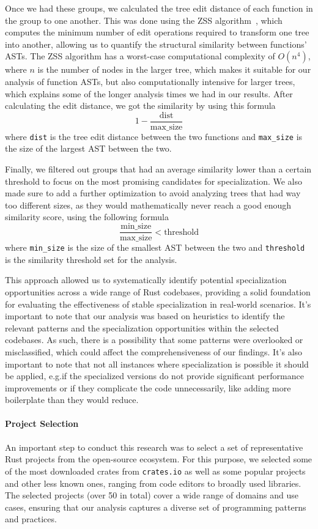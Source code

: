 Once we had these groups, we calculated the tree edit distance of each function in the group to one another.
This was done using the ZSS algorithm~\cite{ZSSTreeEditDistance89}, which computes the minimum number of edit operations required to transform one tree into another, allowing us to quantify the structural similarity between functions' ASTs.
The ZSS algorithm has a worst-case computational complexity of \(O(n^4)\), where \(n\) is the number of nodes in the larger tree, which makes it suitable for our analysis of function ASTs, but also computationally intensive for larger trees, which explains some of the longer analysis times we had in our results.
After calculating the edit distance, we got the similarity by using this formula $$1 - \frac{\text{dist}}{\text{max\_size}}$$ where \texttt{dist} is the tree edit distance between the two functions and \texttt{max\_size} is the size of the largest AST between the two.

Finally, we filtered out groups that had an average similarity lower than a certain threshold to focus on the most promising candidates for specialization.
We also made sure to add a further optimization to avoid analyzing trees that had way too different sizes, as they would mathematically never reach a good enough similarity score, using the following formula $$\frac{\text{min\_size}}{\text{max\_size}} < \text{threshold}$$ where \texttt{min\_size} is the size of the smallest AST between the two and \texttt{threshold} is the similarity threshold set for the analysis.

This approach allowed us to systematically identify potential specialization opportunities across a wide range of Rust codebases, providing a solid foundation for evaluating the effectiveness of stable specialization in real-world scenarios.
It's important to note that our analysis was based on heuristics to identify the relevant patterns and the specialization opportunities within the selected codebases.
As such, there is a possibility that some patterns were overlooked or misclassified, which could affect the comprehensiveness of our findings.
It's also important to note that not all instances where specialization is possible it should be applied, e.g.\@ if the specialized versions do not provide significant performance improvements or if they complicate the code unnecessarily, like adding more boilerplate than they would reduce.

\paragraph{Project Selection}
An important step to conduct this research was to select a set of representative Rust projects from the open-source ecosystem.
For this purpose, we selected some of the most downloaded crates from \texttt{crates.io} as well as some popular projects and other less known ones, ranging from code editors to broadly used libraries.
The selected projects (over 50 in total) cover a wide range of domains and use cases, ensuring that our analysis captures a diverse set of programming patterns and practices.

